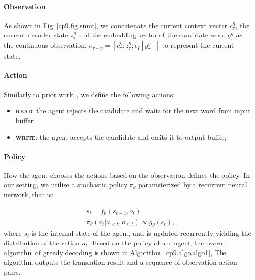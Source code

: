 \paragraph{Observation} As shown in Fig~\ref{cp9.fig.snmt}, we concatenate the current context vector $c_{\tau}^{\eta}$, the current decoder state $z_{\tau}^{\eta}$ and the embedding vector of the candidate word $y_{\tau}^{\eta}$ as the continuous observation, $o_{\tau+\eta}=\left[c_{\tau}^{\eta}; z_{\tau}^{\eta}; \epsilon_I[y_{\tau}^{\eta}]\right]$ to represent the current state.%

\paragraph{Action} Similarly to prior work~\cite{grissomii2014don}, we define the following actions:
\begin{itemize}
    \item \textbf{\textsc{read}}: the agent rejects the candidate and waits for the next word from input buffer;
    \item \textbf{\textsc{write}}: the agent accepts the candidate and emits it to output buffer;
\end{itemize}

\paragraph{Policy} How the agent chooses the actions based on the observation defines the policy. In our setting, we utilize a stochastic policy $\pi_{\theta}$ parameterized by a recurrent neural network, that is:

\begin{equation}
    \begin{split}
        &s_t = f_{\theta}\left(s_{t-1}, o_t\right)\\
        &\pi_{\theta}(a_t|a_{<t}, o_{\leq t}) \propto g_{\theta}\left(s_t\right), 
    \end{split}
\end{equation}
where $s_t$ is the internal state of the agent, and is updated recurrently yielding the distribution of the action $a_t$. 
Based on the policy of our agent, the overall algorithm of greedy decoding is shown in Algorithm~\ref{cp9.algo.algo1}, %
The algorithm outputs the translation result and a sequence of observation-action pairs.


